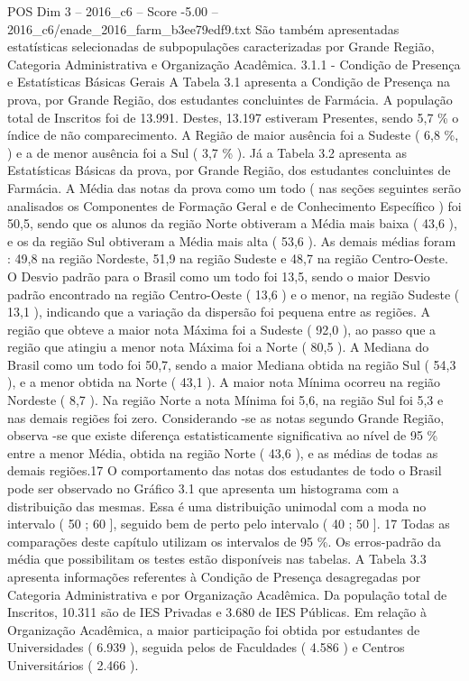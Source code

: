 \begin{textsample}{POS Dim 3 – 2016\_c6 – Score -5.00 – 2016\_c6/enade\_2016\_farm\_b3ee79edf9.txt}
São também apresentadas estatísticas selecionadas de subpopulações caracterizadas por Grande Região, Categoria Administrativa e Organização Acadêmica. 3.1.1 - Condição de Presença e Estatísticas Básicas Gerais A Tabela 3.1 apresenta a Condição de Presença na prova, por Grande Região, dos estudantes concluintes de Farmácia.
A população total de Inscritos foi de 13.991.
Destes, 13.197 estiveram Presentes, sendo 5,7 \% o índice de não comparecimento.
A Região de maior ausência foi a Sudeste ( 6,8 \%, ) e a de menor ausência foi a Sul ( 3,7 \% ).
Já a Tabela 3.2 apresenta as Estatísticas Básicas da prova, por Grande Região, dos estudantes concluintes de Farmácia.
A Média das notas da prova como um todo ( nas seções seguintes serão analisados os Componentes de Formação Geral e de Conhecimento Específico ) foi 50,5, sendo que os alunos da região Norte obtiveram a Média mais baixa ( 43,6 ), e os da região Sul obtiveram a Média mais alta ( 53,6 ).
As demais médias foram : 49,8 na região Nordeste, 51,9 na região Sudeste e 48,7 na região Centro-Oeste.
O Desvio padrão para o Brasil como um todo foi 13,5, sendo o maior Desvio padrão encontrado na região Centro-Oeste ( 13,6 ) e o menor, na região Sudeste ( 13,1 ), indicando que a variação da dispersão foi pequena entre as regiões.
A região que obteve a maior nota Máxima foi a Sudeste ( 92,0 ), ao passo que a região que atingiu a menor nota Máxima foi a Norte ( 80,5 ).
A Mediana do Brasil como um todo foi 50,7, sendo a maior Mediana obtida na região Sul ( 54,3 ), e a menor obtida na Norte ( 43,1 ).
A maior nota Mínima ocorreu na região Nordeste ( 8,7 ).
Na região Norte a nota Mínima foi 5,6, na região Sul foi 5,3 e nas demais regiões foi zero.
Considerando -se as notas segundo Grande Região, observa -se que existe diferença estatisticamente significativa ao nível de 95 \% entre a menor Média, obtida na região Norte ( 43,6 ), e as médias de todas as demais regiões.17 O comportamento das notas dos estudantes de todo o Brasil pode ser observado no Gráfico 3.1 que apresenta um histograma com a distribuição das mesmas.
Essa é uma distribuição unimodal com a moda no intervalo ( 50 ; 60 ], seguido bem de perto pelo intervalo ( 40 ; 50 ]. 17 Todas as comparações deste capítulo utilizam os intervalos de 95 \%.
Os erros-padrão da média que possibilitam os testes estão disponíveis nas tabelas.
A Tabela 3.3 apresenta informações referentes à Condição de Presença desagregadas por Categoria Administrativa e por Organização Acadêmica.
Da população total de Inscritos, 10.311 são de IES Privadas e 3.680 de IES Públicas.
Em relação à Organização Acadêmica, a maior participação foi obtida por estudantes de Universidades ( 6.939 ), seguida pelos de Faculdades ( 4.586 ) e Centros Universitários ( 2.466 ).

\end{textsample}
